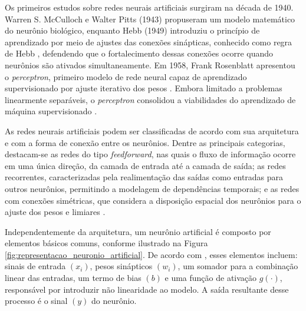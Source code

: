 
Os primeiros estudos sobre redes neurais artificiais surgiram na década de 1940. Warren S. McCulloch e Walter Pitts (1943) propuseram um modelo matemático do neurônio biológico, enquanto Hebb (1949) introduziu o princípio de aprendizado por meio de ajustes das conexões sinápticas, conhecido como regra de Hebb \cite{MCCULLOCH1943, Passos2017}, defendendo que o fortalecimento dessas conexões ocorre quando neurônios são ativados simultaneamente. Em 1958, Frank Rosenblatt apresentou o \textit{perceptron}, primeiro modelo de rede neural capaz de aprendizado supervisionado por ajuste iterativo dos pesos \cite{ROSENBLATT1958}. Embora limitado a problemas linearmente separáveis, o \textit{perceptron} consolidou a viabilidades do aprendizado de máquina supervisionado \cite{Vinicius2017}.

As redes neurais artificiais podem ser classificadas de acordo com sua arquitetura e com a forma de conexão entre os neurônios. Dentre as principais categorias, destacam-se as redes do tipo \textit{feedforward}, nas quais o fluxo de informação ocorre em uma única direção, da camada de entrada até a camada de saída; as redes recorrentes, caracterizadas pela realimentação das saídas como entradas para outros neurônios, permitindo a modelagem de dependências temporais; e as redes com conexões simétricas, que considera a disposição espacial dos neurônios para o ajuste dos pesos e limiares \cite{ArquiteturasRNA}.

Independentemente da arquitetura, um neurônio artificial é composto por elementos básicos comuns, conforme ilustrado na Figura \ref{fig:representacao_neuronio_artificial}. De acordo com \cite{HAYKIN2001}, esses elementos incluem: sinais de entrada $(x_i)$, pesos sinápticos $(w_i)$, um somador para a combinação linear das entradas, um termo de bias $(b)$ e uma função de ativação $g(\cdot)$, responsável por introduzir não linearidade ao modelo. A saída resultante desse processo é o sinal $(y)$ do neurônio.


